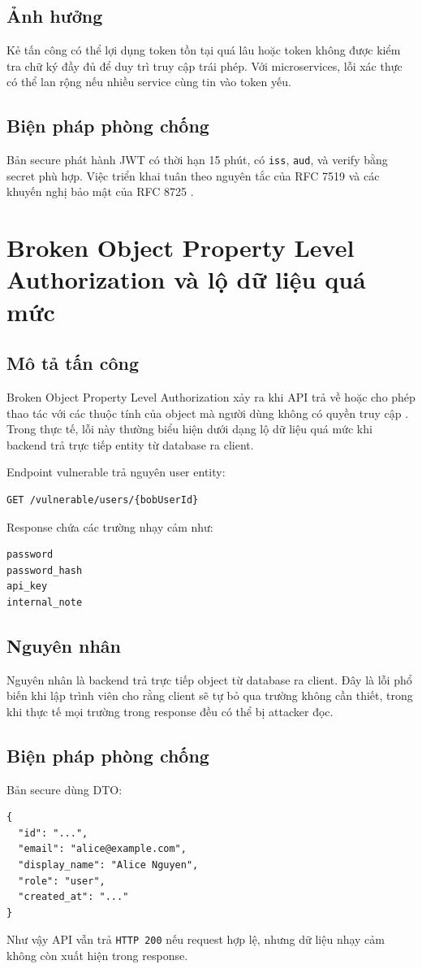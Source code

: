 \documentclass[14pt,a4paper]{extreport}
\begin{document}
\subsection{Ảnh hưởng}
Kẻ tấn công có thể lợi dụng token tồn tại quá lâu hoặc token không được kiểm tra chữ ký đầy đủ để duy trì truy cập trái phép. Với microservices, lỗi xác thực có thể lan rộng nếu nhiều service cùng tin vào token yếu.

\subsection{Biện pháp phòng chống}
Bản secure phát hành JWT có thời hạn 15 phút, có \texttt{iss}, \texttt{aud}, và verify bằng secret phù hợp. Việc triển khai tuân theo nguyên tắc của RFC 7519 và các khuyến nghị bảo mật của RFC 8725 \cite{jwt7519,jwt8725}.

\section{Broken Object Property Level Authorization và lộ dữ liệu quá mức}
\subsection{Mô tả tấn công}
Broken Object Property Level Authorization xảy ra khi API trả về hoặc cho phép thao tác với các thuộc tính của object mà người dùng không có quyền truy cập \cite{owaspbopla}. Trong thực tế, lỗi này thường biểu hiện dưới dạng lộ dữ liệu quá mức khi backend trả trực tiếp entity từ database ra client.

Endpoint vulnerable trả nguyên user entity:
\begin{lstlisting}
GET /vulnerable/users/{bobUserId}
\end{lstlisting}
Response chứa các trường nhạy cảm như:
\begin{lstlisting}
password
password_hash
api_key
internal_note
\end{lstlisting}

\subsection{Nguyên nhân}
Nguyên nhân là backend trả trực tiếp object từ database ra client. Đây là lỗi phổ biến khi lập trình viên cho rằng client sẽ tự bỏ qua trường không cần thiết, trong khi thực tế mọi trường trong response đều có thể bị attacker đọc.

\subsection{Biện pháp phòng chống}
Bản secure dùng DTO:
\begin{lstlisting}
{
  "id": "...",
  "email": "alice@example.com",
  "display_name": "Alice Nguyen",
  "role": "user",
  "created_at": "..."
}
\end{lstlisting}
Như vậy API vẫn trả \texttt{HTTP 200} nếu request hợp lệ, nhưng dữ liệu nhạy cảm không còn xuất hiện trong response.
\end{document}
